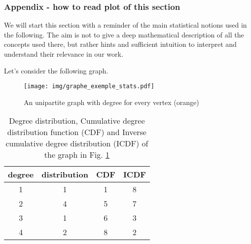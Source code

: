 \documentclass[table]{report}
\begin{document}
\subsubsection{Appendix - how to read plot of this section}

We will start this section with a reminder of the main statistical notions used in the following. The aim is not to give a deep mathematical description of all the concepts used there, but rather hints and sufficient intuition to interpret and understand their relevance in our work. 

Let's consider the following graph. 

\begin{figure}[h]%
\centering
\texttt{[image: img/graphe\_exemple\_stats.pdf]}
\caption{An unipartite graph with degree for every vertex (orange)}
\label{fig:graphe_exemple_stats}
\end{figure}
\FloatBarrier


\begin{table}[h]
\centering
\begin{tabular}{cccc}
\hline
degree & distribution & CDF & ICDF \\ \hline
1      & 1     & 1   & 8    \\
2      & 4     & 5   & 7    \\
3      & 1     & 6   & 3    \\
4      & 2     & 8   & 2    \\ \hline
\end{tabular}
\caption{Degree distribution, Cumulative degree distribution function (CDF) and Inverse cumulative degree distribution (ICDF) of the graph in Fig. \ref{fig:graphe_exemple_stats}}
\label{tab:my-table}
\end{table}
\end{document}
